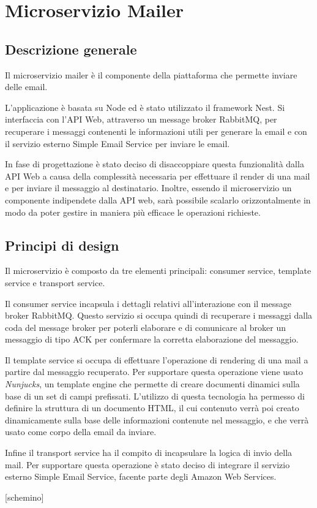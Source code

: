
\section{Microservizio Mailer}
\subsection{Descrizione generale}
Il microservizio mailer è il componente della piattaforma che permette inviare delle email.

L'applicazione è basata su Node ed è stato utilizzato il framework Nest.
Si interfaccia con l'API Web, attraverso un message broker RabbitMQ, per recuperare i messaggi contenenti le informazioni utili per generare la email e con il servizio esterno Simple Email Service per inviare le email.

In fase di progettazione è stato deciso di disaccoppiare questa funzionalità dalla API Web a causa della complessità necessaria per effettuare il render di una mail e per inviare il messaggio al destinatario.
Inoltre, essendo il microservizio un componente indipendete dalla API web, sarà possibile scalarlo orizzontalmente in modo da poter gestire in maniera più efficace le operazioni richieste.

\subsection{Principi di design}
Il microservizio è composto da tre elementi principali: consumer service, template service e transport service.

Il consumer service incapsula i dettagli relativi all'interazione con il message broker RabbitMQ. Questo servizio si occupa quindi di recuperare i messaggi dalla coda del message broker per poterli elaborare e di comunicare
al broker un messaggio di tipo ACK per confermare la corretta elaborazione del messaggio.

Il template service si occupa di effettuare l'operazione di rendering di una mail a partire dal messaggio recuperato. Per supportare questa operazione viene usato \textit{Nunjucks}, un template engine che permette di creare documenti dinamici
sulla base di un set di campi prefissati. L'utilizzo di questa tecnologia ha permesso di definire la struttura di un documento HTML, il cui contenuto verrà poi creato dinamicamente sulla base delle informazioni contenute nel messaggio, e che
verrà usato come corpo della email da inviare.

Infine il transport service ha il compito di incapsulare la logica di invio della mail. Per supportare questa operazione è stato deciso di integrare il servizio esterno Simple Email Service, facente parte degli Amazon Web Services.

    [schemino]

